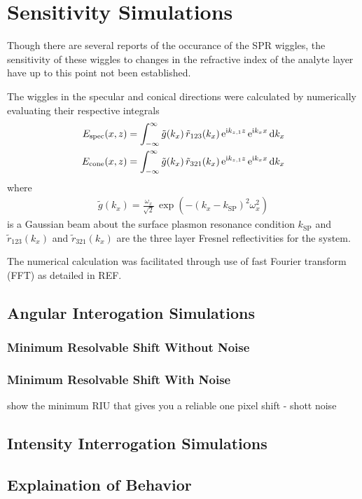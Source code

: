 \section{Sensitivity Simulations}
Though there are several reports of the occurance of the SPR wiggles, the
sensitivity of these wiggles to changes in the refractive index of the
analyte layer have up to this point not been established.  

The wiggles in the specular and conical directions were calculated by
numerically evaluating their respective integrals
\begin{align}
 E_\text{spec}(x,z) &=  \int_{-\infty}^{\infty} \tilde{g}(k_x)\, \tilde{r}_{123}(k_x)\,
 {\mathrm{e}}^{{\mathrm{i}} k_{z,1} z}\, {\mathrm{e}}^{{\mathrm{i}} k_x x} \,\mathrm{d} k_x\\
 E_\text{cone}(x,z) &= \int_{-\infty}^{\infty} \tilde{g}(k_x)\,
 \tilde{r}_{321}(k_x)\,{\mathrm{e}}^{{\mathrm{i}} k_{z,1} z}\, {\mathrm{e}}^{{\mathrm{i}} k_x x} \,\mathrm{d} k_x
\end{align}
where 
\begin{align}
 \tilde{g}(k_x) = \frac{\omega_x}{\sqrt{2}}\,\exp\left({-(k_x-k_\text{SP})^2 \omega_x^2}\right)
\end{align}
is a Gaussian beam about the surface plasmon resonance condition
$k_\text{SP}$ and $\tilde{r}_{123}(k_x)$ and $\tilde{r}_{321}(k_x)$ are the
three layer Fresnel reflectivities for the system.  

The numerical calculation was facilitated through use of fast Fourier
transform (FFT) as detailed in REF.

\subsection{Angular Interogation Simulations}

\subsubsection{Minimum Resolvable Shift Without Noise}


\subsubsection{Minimum Resolvable Shift With Noise}
show the minimum RIU that gives you a reliable one pixel shift - shott
noise

\subsection{Intensity Interrogation Simulations}


\subsection{Explaination of Behavior}
